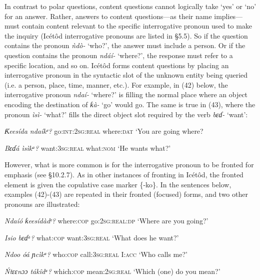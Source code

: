 In contrast to polar questions, content questions cannot logically take ‘yes’ or ‘no’ for an answer. Rather, answers to content questions—as their name implies—must contain content relevant to the specific interrogative pronoun used to make the inquiry (Icétôd interrogative pronouns are listed in §5.5). So if the question contains the pronoun \textit{ǹdò-} ‘who?’, the answer must include a person. Or if the question contains the pronoun \textit{ndáí-} ‘where?’, the response must refer to a specific location, and so on. Icétôd forms content questions by placing an interrogative pronoun in the syntactic slot of the unknown entity being queried (i.e. a person, place, time, manner, etc.). For example, in (42) below, the interrogative pronoun \textit{ndaí-} ‘where?’ is filling the normal place where an object encoding the destination of \textit{ƙà-} ‘go’ would go. The same is true in (43), where the pronoun \textit{ìsì-} ‘what?’ fills the direct object slot required by the verb \textit{bɛɗ-} ‘want’:




\textit{Ƙ}\textit{eesída     ndaíkᵉ?}
go:\textsc{int:2sg:real}   where:\textsc{dat}
‘You are going where?




\textit{Bɛɗá       ìsìkᵃ?}
want:\textsc{3sg:real}   what:\textsc{nom}
‘He wants what?’


However, what is more common is for the interrogative pronoun to be fronted for emphasis (see §10.2.7). As in other instances of fronting in Icétôd, the fronted element is given the copulative case marker \{-ko\}. In the sentences below, examples (42)-(43) are repeated in their fronted (focused) forms, and two other pronouns are illustrated:



\textit{Ndaíó   ƙeesídàdᵉ?}
where:\textsc{cop}   go:\textsc{2sg:real:dp}
‘Where are you going?’




\textit{Isio     bɛɗᵃ?}
what:\textsc{cop}   want:\textsc{3sg:real}
‘What does he want?’




\textit{Ndoo     óá       ɲcìkᵃ?}
who:\textsc{cop}   call:\textsc{3sg:real}   I:\textsc{acc}
‘Who calls me?’




\textit{\'{N}tɛɛnɔɔ   tákîdᵃ?}
which:\textsc{cop}   mean:\textsc{2sg:real}
‘Which (one) do you mean?’






